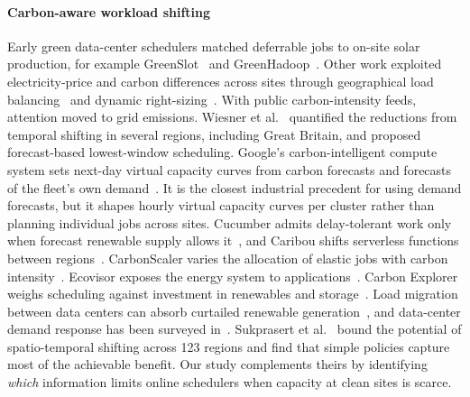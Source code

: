 \paragraph{Carbon-aware workload shifting} Early green data-center schedulers matched deferrable jobs to on-site solar production, for example GreenSlot~\cite{goiri2011greenslot} and GreenHadoop~\cite{goiri2012greenhadoop}. Other work exploited electricity-price and carbon differences across sites through geographical load balancing~\cite{rao2010minimizing,liu2011greening} and dynamic right-sizing~\cite{lin2013dynamic}. With public carbon-intensity feeds, attention moved to grid emissions. Wiesner et al.~\cite{wiesner2021lets} quantified the reductions from temporal shifting in several regions, including Great Britain, and proposed forecast-based lowest-window scheduling. Google's carbon-intelligent compute system sets next-day virtual capacity curves from carbon forecasts and forecasts of the fleet's own demand~\cite{radovanovic2023carbon}. It is the closest industrial precedent for using demand forecasts, but it shapes hourly virtual capacity curves per cluster rather than planning individual jobs across sites. Cucumber admits delay-tolerant work only when forecast renewable supply allows it~\cite{wiesner2022cucumber}, and Caribou shifts serverless functions between regions~\cite{gsteiger2024caribou}. CarbonScaler varies the allocation of elastic jobs with carbon intensity~\cite{hanafy2023carbonscaler}. Ecovisor exposes the energy system to applications~\cite{souza2023ecovisor}. Carbon Explorer weighs scheduling against investment in renewables and storage~\cite{acun2023carbon}. Load migration between data centers can absorb curtailed renewable generation~\cite{zheng2020mitigating}, and data-center demand response has been surveyed in~\cite{wierman2014opportunities}. Sukprasert et al.~\cite{sukprasert2024limitations} bound the potential of spatio-temporal shifting across 123 regions and find that simple policies capture most of the achievable benefit. Our study complements theirs by identifying \emph{which} information limits online schedulers when capacity at clean sites is scarce.

